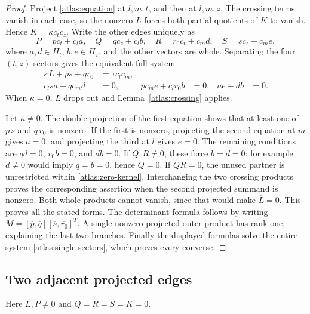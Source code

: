 \begin{proof}
Project \eqref{atlas:equation} at \(l,m,t\), and then at \(l,m,z\).
The crossing terms vanish in each case, so the nonzero \(\overline L\)
forces both partial quotients of \(K\) to vanish.  Hence \(K=\kappa c_tc_z\).
Write the other edges uniquely as
\[
 P=p c_t+c_la,\quad Q=q c_z+c_lb,\quad
 R=r_0c_t+c_md,\quad S=s c_z+c_me,
\]
where \(a,d\in H_t\), \(b,e\in H_z\), and the other vectors are whole.
Separating the four \((t,z)\) sectors gives the equivalent full system
\begin{equation}\label{atlas:single-sectors}
\begin{aligned}
 \kappa L+ps+qr_0&=\tau c_lc_m,\\
 c_lsa+qc_md&=0,&
 pc_me+c_lr_0b&=0,& ae+db&=0.
\end{aligned}
\end{equation}
When \(\kappa=0\), \(L\) drops out and Lemma~\ref{atlas:crossing} applies.

Let \(\kappa\ne0\).  The double projection of the first equation shows
that at least one of \(\overline p\,\overline s\) and
\(\overline q\,\overline{r_0}\) is nonzero.  If the first is nonzero,
projecting the second equation at \(m\) gives \(a=0\), and projecting the
third at \(l\) gives \(e=0\).  The remaining conditions are
\(qd=0\), \(r_0b=0\), and \(db=0\).  If \(Q,R\ne0\), these force
\(b=d=0\): for example \(d\ne0\) would imply \(q=b=0\), hence \(Q=0\).
If \(QR=0\), the unused partner is unrestricted within
\eqref{atlas:zero-kernel}.  Interchanging the two crossing products proves
the corresponding assertion when the second projected summand is nonzero.
Both whole products cannot vanish, since that would make \(\overline L=0\).
This proves all the stated forms.  The determinant formula follows by
writing \(M=[\overline p,\overline q][\overline s,\overline{r_0}]^T\).
A single nonzero projected outer product has rank one, explaining the last
two branches.  Finally the displayed formulas solve the entire system
\eqref{atlas:single-sectors}, which proves every converse.
\end{proof}

\subsection{Two adjacent projected edges}

Here \(\overline L,\overline P\ne0\) and
\(\overline Q=\overline R=\overline S=\overline K=0\).

